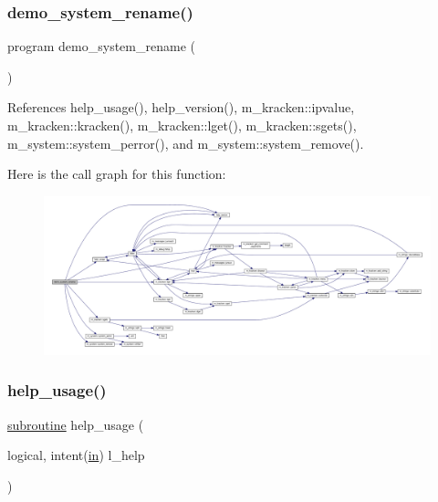 \subsubsection{\texorpdfstring{demo\+\_\+system\+\_\+rename()}{demo\_system\_rename()}}
{\footnotesize\ttfamily program demo\+\_\+system\+\_\+rename (\begin{DoxyParamCaption}{ }\end{DoxyParamCaption})}



References help\+\_\+usage(), help\+\_\+version(), m\+\_\+kracken\+::ipvalue, m\+\_\+kracken\+::kracken(), m\+\_\+kracken\+::lget(), m\+\_\+kracken\+::sgets(), m\+\_\+system\+::system\+\_\+perror(), and m\+\_\+system\+::system\+\_\+remove().

Here is the call graph for this function\+:
\nopagebreak
\begin{figure}[H]
\begin{center}
\leavevmode
\includegraphics[width=350pt]{__rm_8f90_aad99fde3e962ae73c9d6bc3825b8ca79_cgraph}
\end{center}
\end{figure}
\mbox{\label{__rm_8f90_a3e09a3b52ee8fb04eeb93fe5761626a8}} 
\subsubsection{\texorpdfstring{help\+\_\+usage()}{help\_usage()}}
{\footnotesize\ttfamily \hyperlink{M__stopwatch_83_8txt_acfbcff50169d691ff02d4a123ed70482}{subroutine} help\+\_\+usage (\begin{DoxyParamCaption}\item[{logical, intent(\hyperlink{M__journal_83_8txt_afce72651d1eed785a2132bee863b2f38}{in})}]{l\+\_\+help }\end{DoxyParamCaption})}




